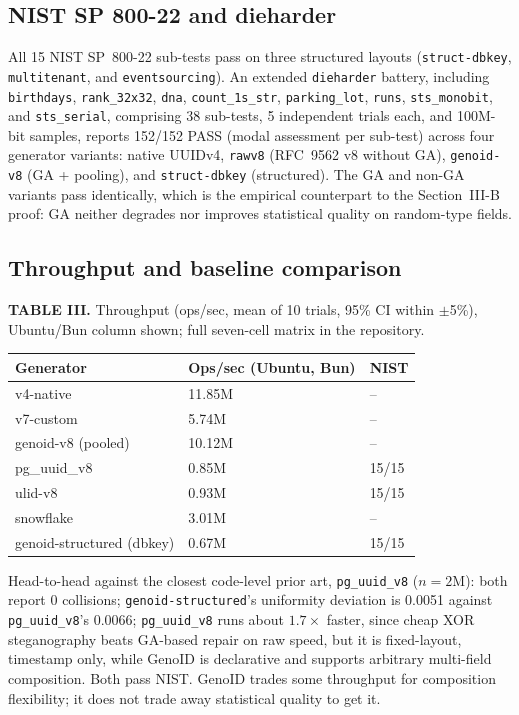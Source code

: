 \documentclass[conference]{IEEEtran}
\begin{document}
\subsection{NIST SP 800-22 and dieharder}
All 15 NIST SP~800-22 sub-tests pass on three structured layouts (\texttt{struct-dbkey}, \texttt{multitenant}, and \texttt{eventsourcing}). An extended \texttt{dieharder} battery, including \texttt{birthdays}, \texttt{rank\_32x32}, \texttt{dna}, \texttt{count\_1s\_str}, \texttt{parking\_lot}, \texttt{runs}, \texttt{sts\_monobit}, and \texttt{sts\_serial}, comprising 38 sub-tests, 5 independent trials each, and 100M-bit samples, reports 152/152 PASS (modal assessment per sub-test) across four generator variants: native UUIDv4, \texttt{rawv8} (RFC~9562 v8 without GA), \texttt{genoid-v8} (GA + pooling), and \texttt{struct-dbkey} (structured). The GA and non-GA variants pass identically, which is the empirical counterpart to the Section~III-B proof: GA neither degrades nor improves statistical quality on random-type fields.

\subsection{Throughput and baseline comparison}
\begin{center}
\scriptsize
\textbf{TABLE III.} Throughput (ops/sec, mean of 10 trials, 95\% CI within $\pm$5\%), Ubuntu/Bun column shown; full seven-cell matrix in the repository.

\vspace{0.3em}

\begin{tabular}{lll}
\hline
\textbf{Generator} & \textbf{Ops/sec (Ubuntu, Bun)} & \textbf{NIST} \\
\hline
v4-native & 11.85M & -- \\
v7-custom & 5.74M & -- \\
genoid-v8 (pooled) & 10.12M & -- \\
pg\_uuid\_v8 & 0.85M & 15/15 \\
ulid-v8 & 0.93M & 15/15 \\
snowflake & 3.01M & -- \\
genoid-structured (dbkey) & 0.67M & 15/15 \\
\hline
\end{tabular}
\end{center}

Head-to-head against the closest code-level prior art, \texttt{pg\_uuid\_v8} ($n=2$M): both report 0 collisions; \texttt{genoid-structured}'s uniformity deviation is 0.0051 against \texttt{pg\_uuid\_v8}'s 0.0066; \texttt{pg\_uuid\_v8} runs about $1.7\times$ faster, since cheap XOR steganography beats GA-based repair on raw speed, but it is fixed-layout, timestamp only, while GenoID is declarative and supports arbitrary multi-field composition. Both pass NIST. GenoID trades some throughput for composition flexibility; it does not trade away statistical quality to get it.
\end{document}
